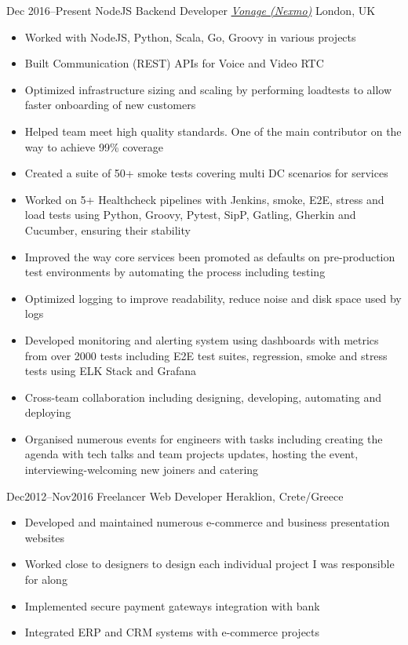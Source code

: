 \begin{entrylist}
\entry
{Dec 2016--Present}
{NodeJS Backend Developer {\normalfont \emph{\href{https://www.vonage.co.uk/}{Vonage (Nexmo)}}}}
{London, UK}
\vspace{-0.6cm}
\begin{itemize}[leftmargin=.6cm]
	\item Worked with NodeJS, Python, Scala, Go, Groovy in various projects
	\item Built Communication (REST) APIs for Voice and Video RTC
	\item Optimized infrastructure sizing and scaling by performing loadtests to allow faster onboarding of new customers
	\item Helped team meet high quality standards. One of the main contributor on the way to achieve 99\% coverage
	\item Created a suite of 50+ smoke tests covering multi DC scenarios for services
	\item Worked on 5+ Healthcheck pipelines with Jenkins, smoke, E2E, stress and load tests using Python, Groovy, Pytest, SipP, Gatling, Gherkin and Cucumber, ensuring their stability
	\item Improved the way core services been promoted as defaults on pre-production test environments by automating the process including testing
	\item Optimized logging to improve readability, reduce noise and disk space used by logs
	\item Developed monitoring and alerting system using dashboards with metrics from over 2000 tests including E2E test suites, regression, smoke and stress tests using ELK Stack and Grafana
	\item Cross-team collaboration including designing, developing, automating and deploying
	\item Organised numerous events for engineers with tasks including creating the agenda with tech talks and team projects updates, hosting the event, interviewing-welcoming new joiners and catering
\end{itemize}

\entry
{Dec2012–Nov2016}
{Freelancer Web Developer}
{Heraklion, Crete/Greece}
\vspace{-0.6cm}
\begin{itemize}[leftmargin=.6cm]
	\item Developed and maintained numerous e-commerce and business presentation websites
	\item Worked close to designers to design each individual project I was responsible for along
	\item Implemented secure payment gateways integration with bank
	\item Integrated ERP and CRM systems with e-commerce projects 
\end{itemize}

\end{entrylist}

